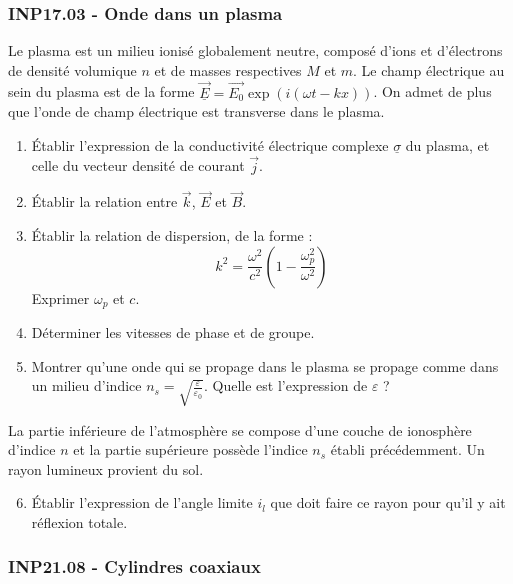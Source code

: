 \newpage
\subsubsection*{INP17.03 - Onde dans un plasma }

Le plasma est un milieu ionisé globalement neutre, composé d'ions et d'électrons de densité volumique $n$ et de masses respectives $M$ et $m$. Le champ électrique au sein du plasma est de la forme $\overrightarrow{\underline{E}} = \overrightarrow{E_0} \exp\left(i(\omega t - kx)\right)$. On admet de plus que l'onde de champ électrique est transverse dans le plasma.

\begin{enumerate}
    \item Établir l'expression de la conductivité électrique complexe $\underline{\sigma}$ du plasma, et celle du vecteur densité de courant $\overrightarrow{j}$.
    \item Établir la relation entre $\overrightarrow{k}$, $\overrightarrow{E}$ et $\overrightarrow{B}$.
    \item Établir la relation de dispersion, de la forme :
    \[
    k^2 = \frac{\omega^2}{c^2} \left(1 - \frac{\omega_p^2}{\omega^2}\right)
    \]
    Exprimer $\omega_p$ et $c$.
    \item Déterminer les vitesses de phase et de groupe.
    \item Montrer qu'une onde qui se propage dans le plasma se propage comme dans un milieu d'indice $n_s = \sqrt{\frac{\varepsilon}{\varepsilon_0}}$. Quelle est l'expression de $\varepsilon$ ?
\end{enumerate}

La partie inférieure de l'atmosphère se compose d'une couche de ionosphère d'indice $n$ et la partie supérieure possède l'indice $n_s$ établi précédemment. Un rayon lumineux provient du sol.

\begin{enumerate}
    \setcounter{enumi}{5}
    \item Établir l'expression de l'angle limite $i_l$ que doit faire ce rayon pour qu'il y ait réflexion totale.
\end{enumerate}

\subsubsection*{INP21.08 - Cylindres coaxiaux  \corrige}

